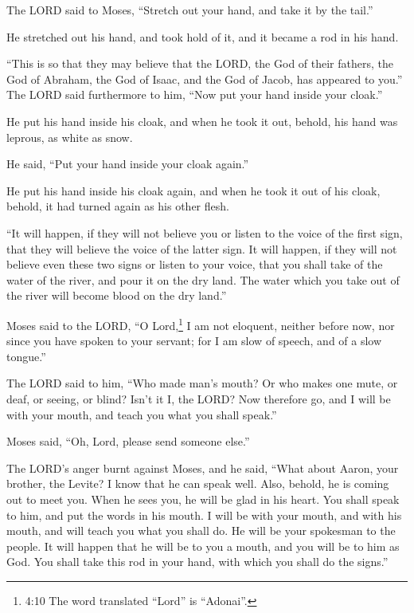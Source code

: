  The LORD said to Moses, ``Stretch out your hand, and take
it by the tail.''

He stretched out his hand, and took hold of it, and it became a rod in
his hand.

 ``This is so that they may believe that the LORD, the God
of their fathers, the God of Abraham, the God of Isaac, and the God of
Jacob, has appeared to you.''  The LORD said furthermore to
him, ``Now put your hand inside your cloak.''

He put his hand inside his cloak, and when he took it out, behold, his
hand was leprous, as white as snow.

 He said, ``Put your hand inside your cloak again.''

He put his hand inside his cloak again, and when he took it out of his
cloak, behold, it had turned again as his other flesh.

 ``It will happen, if they will not believe you or listen to
the voice of the first sign, that they will believe the voice of the
latter sign.  It will happen, if they will not believe even
these two signs or listen to your voice, that you shall take of the
water of the river, and pour it on the dry land. The water which you
take out of the river will become blood on the dry land.''

 Moses said to the LORD, ``O Lord,\footnote{4:10 The word
  translated ``Lord'' is ``Adonai''.} I am not eloquent, neither before
now, nor since you have spoken to your servant; for I am slow of speech,
and of a slow tongue.''

 The LORD said to him, ``Who made man's mouth? Or who makes
one mute, or deaf, or seeing, or blind? Isn't it I, the LORD?
 Now therefore go, and I will be with your mouth, and teach
you what you shall speak.''

 Moses said, ``Oh, Lord, please send someone else.''

 The LORD's anger burnt against Moses, and he said, ``What
about Aaron, your brother, the Levite? I know that he can speak well.
Also, behold, he is coming out to meet you. When he sees you, he will be
glad in his heart.  You shall speak to him, and put the
words in his mouth. I will be with your mouth, and with his mouth, and
will teach you what you shall do.  He will be your
spokesman to the people. It will happen that he will be to you a mouth,
and you will be to him as God.  You shall take this rod in
your hand, with which you shall do the signs.''

